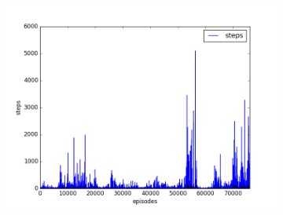\begin{figure}[t]
  ~
  \begin{subfigure}[t]{\figscale\linewidth}
    \includegraphics[width=1.5\textwidth]
    {../results/maddpg_1vs1/steps.png}
    \label{fig:maddpg-1vs1-steps}
  \end{subfigure}


\end{figure}
